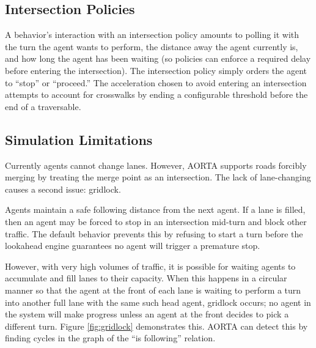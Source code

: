 \documentclass[letterpaper, 10 pt, conference]{ieeeconf}  %
\begin{document}
\subsection{Intersection Policies}

A behavior's interaction with an intersection policy amounts to polling it with
the turn the agent wants to perform, the distance away the agent currently is,
and how long the agent has been waiting (so policies can enforce a required
delay before entering the intersection). The intersection policy simply orders
the agent to ``stop'' or ``proceed.''  The acceleration chosen to
avoid entering an intersection attempts to account for crosswalks by ending a
configurable threshold before the end of a traversable.

\subsection{Simulation Limitations}

Currently agents cannot change lanes. However, AORTA supports roads forcibly
merging by treating the merge point as an intersection. The lack of
lane-changing causes a second issue: gridlock.

Agents maintain a safe following distance from the next agent. If a lane is
filled, then an agent may be forced to stop in an intersection mid-turn and
block other traffic. The default behavior prevents this by refusing to start a
turn before the lookahead engine guarantees no agent will trigger a premature
stop.

However, with very high volumes of traffic, it is possible for waiting agents to
accumulate and fill lanes to their capacity. When this happens in a circular
manner so that the agent at the front of each lane is waiting to perform a turn
into another full lane with the same such head agent, gridlock \cite{gridlock}
occurs; no agent in the system will make progress unless an agent at the front
decides to pick a different turn. Figure \ref{fig:gridlock} demonstrates this.
AORTA can detect this by finding cycles in the graph of the ``is following''
relation.
\end{document}
